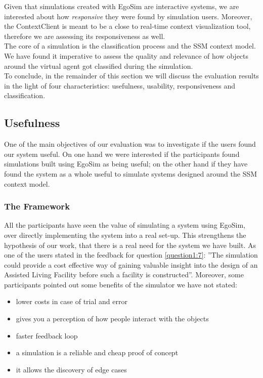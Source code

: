 Given that simulations created with EgoSim are interactive systems, we are interested about how \emph{responsive} they were found by simulation users. Moreover, the ContextClient is meant to be a close to real-time context visualization tool, therefore we are assessing its responsiveness as well.\\

The core of a simulation is the classification process and the SSM context model. We have found it imperative to assess the quality and relevance of how objects around the virtual agent got classified during the simulation.\\

To conclude, in the remainder of this section we will discuss the evaluation results in the light of four characteristics: usefulness, usability, responsiveness and classification.\\

\subsection{Usefulness} %
\label{sec:eval_usefulness}
One of the main objectives of our evaluation was to investigate if the users found our system useful. On one hand we were interested if the participants found simulations built using EgoSim as being useful; on the other hand if they have found the system as a whole useful to simulate systems designed around the SSM context model.\\

\subsubsection{The Framework} %
All the participants have seen the value of simulating a system using EgoSim, over directly implementing the system into a real set-up. This strengthens the hypothesis of our work, that there is a real need for the system we have built. As one of the users stated in the feedback for question \ref{question1:7}: ''The simulation could provide a cost effective way of gaining valuable insight into the design of an Assisted Living Facility before such a facility is constructed''. Moreover, some participants pointed out some benefits of the simulator we have not stated:
\begin{itemize}
	\item lower costs in case of trial and error
	\item gives you a perception of how people interact with the objects
	\item faster feedback loop
	\item a simulation is a reliable and cheap proof of concept
	\item it allows the discovery of edge cases
\end{itemize}

